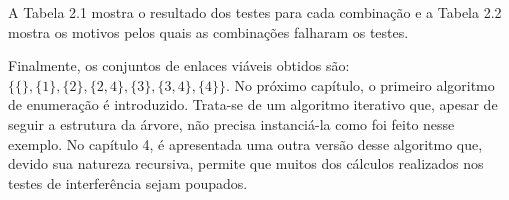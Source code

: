 A Tabela 2.1 mostra o resultado dos testes para cada combinação e a Tabela 2.2 mostra os motivos pelos quais as combinações falharam os testes.



Finalmente, os conjuntos de enlaces viáveis obtidos  são: $\{\{\},\{1\},\{2\},\{2,4\},\{3\},\{3,4\},\{4\}\}$. No próximo capítulo, o primeiro algoritmo de  enumeração é introduzido. Trata-se de um algoritmo iterativo que, apesar de seguir a estrutura da árvore, não precisa instanciá-la como foi feito nesse exemplo. No capítulo 4, é apresentada uma outra versão desse algoritmo que, devido sua natureza recursiva, permite que muitos dos cálculos realizados nos testes de interferência sejam poupados.
